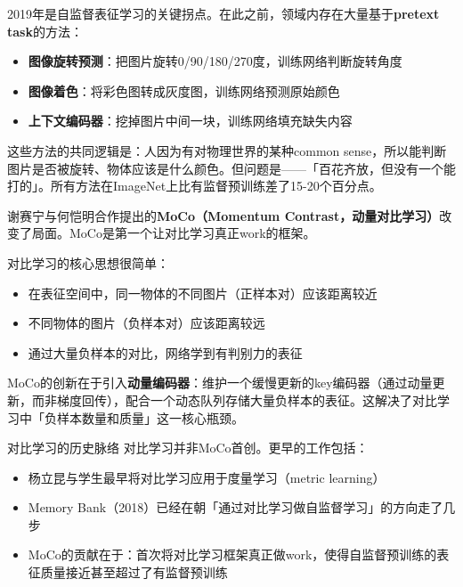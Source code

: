 \documentclass[a4paper]{article}
\begin{document}
2019年是自监督表征学习的关键拐点。在此之前，领域内存在大量基于\textbf{pretext task}的方法：
\begin{itemize}
  \item \textbf{图像旋转预测}：把图片旋转0/90/180/270度，训练网络判断旋转角度
  \item \textbf{图像着色}：将彩色图转成灰度图，训练网络预测原始颜色
  \item \textbf{上下文编码器}：挖掉图片中间一块，训练网络填充缺失内容
\end{itemize}

这些方法的共同逻辑是：人因为有对物理世界的某种common sense，所以能判断图片是否被旋转、物体应该是什么颜色。但问题是——「百花齐放，但没有一个能打的」。所有方法在ImageNet上比有监督预训练差了15-20个百分点。

谢赛宁与何恺明合作提出的\textbf{MoCo（Momentum Contrast，动量对比学习）}改变了局面。MoCo是第一个让对比学习真正work的框架。

对比学习的核心思想很简单：
\begin{itemize}
  \item 在表征空间中，同一物体的不同图片（正样本对）应该距离较近
  \item 不同物体的图片（负样本对）应该距离较远
  \item 通过大量负样本的对比，网络学到有判别力的表征
\end{itemize}

MoCo的创新在于引入\textbf{动量编码器}：维护一个缓慢更新的key编码器（通过动量更新，而非梯度回传），配合一个动态队列存储大量负样本的表征。这解决了对比学习中「负样本数量和质量」这一核心瓶颈。

\begin{knowledgebox}{对比学习的历史脉络}
对比学习并非MoCo首创。更早的工作包括：
\begin{itemize}
  \item 杨立昆与学生最早将对比学习应用于度量学习（metric learning）
  \item Memory Bank（2018）已经在朝「通过对比学习做自监督学习」的方向走了几步
  \item MoCo的贡献在于：首次将对比学习框架真正做work，使得自监督预训练的表征质量接近甚至超过了有监督预训练
\end{itemize}
\end{knowledgebox}
\end{document}
